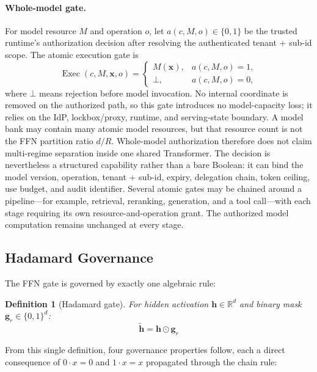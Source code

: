 \documentclass[11pt,a4paper]{article}
\newtheorem{definition}{Definition}
\newcommand{\R}{\mathbb{R}}
\newcommand{\bx}{\mathbf{x}}
\newcommand{\bh}{\mathbf{h}}
\newcommand{\bg}{\mathbf{g}}
\begin{document}
\paragraph{Whole-model gate.}
For model resource $M$ and operation $o$, let
$a(c,M,o)\in\{0,1\}$ be the trusted runtime's authorization decision
after resolving the authenticated tenant + sub-id scope.  The atomic
execution gate is
\begin{equation}
\operatorname{Exec}(c,M,\bx,o)=
\begin{cases}
M(\bx), & a(c,M,o)=1,\\
\bot, & a(c,M,o)=0,
\end{cases}
\label{eq:whole-model-gate}
\end{equation}
where $\bot$ means rejection before model invocation.  No internal
coordinate is removed on the authorized path, so this gate introduces
no model-capacity loss; it relies on the IdP, lockbox/proxy, runtime,
and serving-state boundary.  A model bank may contain many atomic
model resources, but that resource count is not the FFN partition
ratio $d/R$.  Whole-model authorization therefore does not claim
multi-regime separation inside one shared Transformer.  The decision
is nevertheless a structured capability rather than a bare Boolean:
it can bind the model version, operation, tenant + sub-id, expiry,
delegation chain, token ceiling, use budget, and audit identifier.
Several atomic gates may be chained around a pipeline---for example,
retrieval, reranking, generation, and a tool call---with each stage
requiring its own resource-and-operation grant.  The authorized model
computation remains unchanged at every stage.

\subsection{Hadamard Governance}
\label{sec:hadamard}

The FFN gate is governed by exactly one algebraic rule:

\begin{definition}[Hadamard gate]
\label{def:hadamard-gate}
For hidden activation $\bh \in \R^d$ and binary mask
$\bg_r \in \{0,1\}^d$:
\begin{equation}
\tilde{\bh} = \bh \odot \bg_r
\label{eq:hadamard-gate}
\end{equation}
\end{definition}

From this single definition, four governance properties follow,
each a direct consequence of $0 \cdot x = 0$ and $1 \cdot x = x$
propagated through the chain rule:
\end{document}
